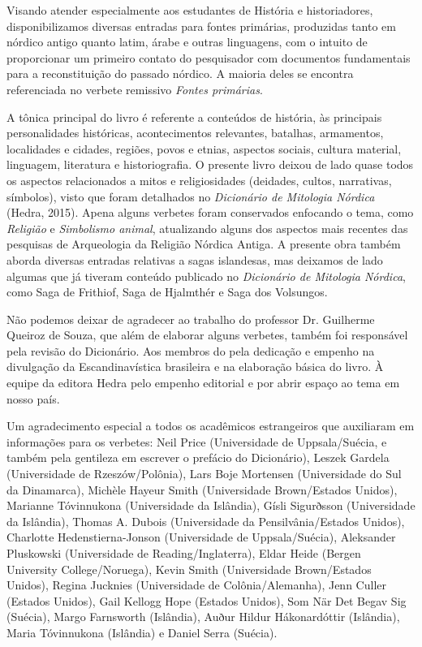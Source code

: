 Visando atender especialmente aos estudantes de História e
historiadores, disponibilizamos diversas entradas para fontes primárias,
produzidas tanto em nórdico antigo quanto latim, árabe e outras
linguagens, com o intuito de proporcionar um primeiro contato do
pesquisador com documentos fundamentais para a reconstituição do passado
nórdico. A maioria deles se encontra referenciada no verbete remissivo
\emph{Fontes primárias}.

A tônica principal do livro é referente a conteúdos de história, às
principais personalidades históricas, acontecimentos relevantes,
batalhas, armamentos, localidades e cidades, regiões, povos e etnias,
aspectos sociais, cultura material, linguagem, literatura e
historiografia. O presente livro deixou de lado quase todos os aspectos
relacionados a mitos e religiosidades (deidades, cultos, narrativas,
símbolos), visto que foram detalhados no \emph{Dicionário de Mitologia
Nórdica} (Hedra, 2015). Apena alguns verbetes foram conservados
enfocando o tema, como \emph{Religião} e \emph{Simbolismo animal},
atualizando alguns dos aspectos mais recentes das pesquisas de
Arqueologia da Religião Nórdica Antiga. A presente obra também aborda
diversas entradas relativas a sagas islandesas, mas deixamos de lado
algumas que já tiveram conteúdo publicado no \emph{Dicionário de
Mitologia Nórdica}, como Saga de Frithiof, Saga de Hjalmthér e Saga dos
Volsungos.

Não podemos deixar de agradecer ao trabalho do professor Dr. Guilherme
Queiroz de Souza, que além de elaborar alguns verbetes, também foi
responsável pela revisão do Dicionário. Aos membros do  pela
dedicação e empenho na divulgação da Escandinavística brasileira e na
elaboração básica do livro. À equipe da editora Hedra pelo empenho
editorial e por abrir espaço ao tema em nosso país.

Um agradecimento especial a todos os acadêmicos estrangeiros que
auxiliaram em informações para os verbetes: Neil Price (Universidade de
Uppsala/Suécia, e também pela gentileza em escrever o prefácio do
Dicionário), Leszek Gardela (Universidade de Rzeszów/Polônia), Lars Boje
Mortensen (Universidade do Sul da Dinamarca), Michèle Hayeur Smith
(Universidade Brown/Estados Unidos), Marianne Tóvinnukona (Universidade
da Islândia), Gísli Sigurðsson (Universidade da Islândia), Thomas A.
Dubois (Universidade da Pensilvânia/Estados Unidos), Charlotte
Hedenstierna-Jonson (Universidade de Uppsala/Suécia), Aleksander
Pluskowski (Universidade de Reading/Inglaterra), Eldar Heide (Bergen
University College/Noruega), Kevin Smith (Universidade Brown/Estados
Unidos), Regina Jucknies (Universidade de Colônia/Alemanha), Jenn Culler
(Estados Unidos), Gail Kellogg Hope (Estados Unidos), Som När Det Begav
Sig (Suécia), Margo Farnsworth (Islândia), Auður Hildur Hákonardóttir
(Islândia), Maria Tóvinnukona (Islândia) e Daniel Serra (Suécia).

